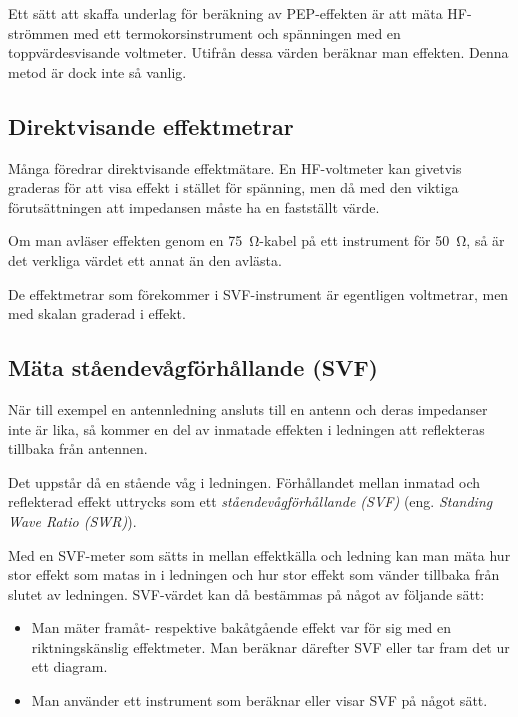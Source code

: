 Ett sätt att skaffa underlag för beräkning av PEP-effekten är att mäta
HF-strömmen med ett termokorsinstrument och spänningen med en
toppvärdesvisande voltmeter.
Utifrån dessa värden beräknar man effekten.
Denna metod är dock inte så vanlig.

\newpage %
\subsection{Direktvisande effektmetrar}

Många föredrar direktvisande effektmätare.
En HF-voltmeter kan givetvis graderas för att visa effekt i stället för
spänning, men då med den viktiga förutsättningen att impedansen måste ha en
fastställt värde.

Om man avläser effekten genom en \SI{75}{\ohm}-kabel på ett instrument för
\SI{50}{\ohm}, så är det verkliga värdet ett annat än den avlästa.

De effektmetrar som förekommer i SVF-instrument är egentligen voltmetrar,
men med skalan graderad i effekt.

\subsection{Mäta ståendevågförhållande (SVF)}
\label{mäta_ståendevåg}


När till exempel en antennledning ansluts till en antenn och deras impedanser
inte är lika, så kommer en del av inmatade effekten i ledningen att
reflekteras tillbaka från antennen.

Det uppstår då en stående våg i ledningen. Förhållandet mellan inmatad
och reflekterad effekt uttrycks som ett \emph{ståendevågförhållande (SVF)}
(eng. \emph{Standing Wave Ratio (SWR)}).

Med en SVF-meter som sätts in mellan effektkälla och ledning kan man
mäta hur stor effekt som matas in i ledningen och hur stor effekt som
vänder tillbaka från slutet av ledningen.
SVF-värdet kan då bestämmas på något av följande sätt:

\begin{itemize}
\item Man mäter framåt- respektive bakåtgående effekt var för sig med
  en riktningskänslig effektmeter.
  Man beräknar därefter SVF eller tar fram det ur ett diagram.
\item Man använder ett instrument som beräknar eller visar SVF på något sätt.
\end{itemize}

